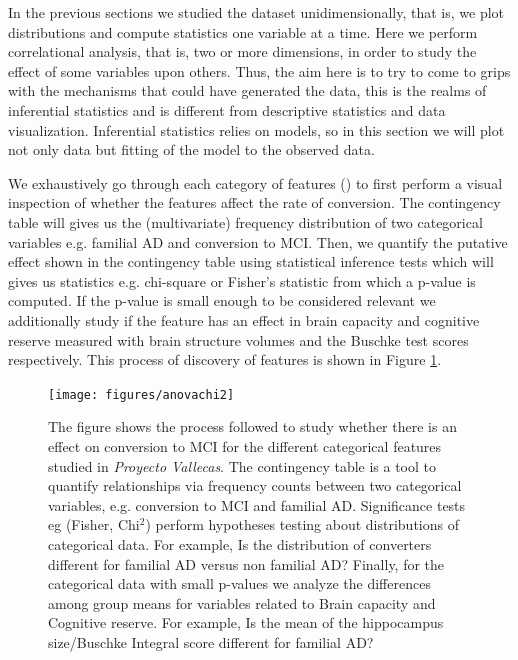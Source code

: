 \documentclass[11pt]{article}
\theoremstyle{definition}
\theoremstyle{remark}
\begin{document}
In the previous sections we studied the dataset unidimensionally, that is, we plot distributions and compute statistics one variable at a time. Here we perform correlational analysis, that is, two or more dimensions, in order to study the effect of some variables upon others. Thus, the aim here is to try to come to grips with the mechanisms that could have generated the data, this is the realms of inferential statistics and is different from descriptive statistics and data visualization. Inferential statistics relies on models, so in this section we will plot not only data but fitting of the model to the observed data.

We exhaustively go through each category of features () to first perform a visual inspection of whether the features affect the rate of conversion. The contingency table will gives us the (multivariate) frequency distribution of two categorical variables e.g. familial AD and conversion to MCI. Then, we quantify the putative effect shown in the contingency table  using statistical inference tests which will gives us statistics e.g. chi-square or Fisher's statistic from which a p-value is computed. If the p-value is small enough to be considered relevant we additionally study if the feature has an effect in brain capacity and cognitive reserve measured with brain structure volumes and the Buschke test scores respectively.
This process of discovery of features is shown in Figure \ref{fig:anovachi}.


\begin{figure}[H]
        \centering
        \texttt{[image: figures/anovachi2]}
        \caption{The figure shows the process followed to study whether there is an effect on conversion to MCI for the different categorical features studied in \emph{Proyecto Vallecas}. The contingency table is a tool to quantify relationships via frequency counts between two categorical variables, e.g. conversion to MCI and familial AD. Significance tests eg (Fisher, Chi$^2$) perform hypotheses testing about distributions of categorical data. For example, Is the distribution of converters different for familial AD versus non familial AD? Finally, for the categorical data with small p-values we analyze the differences among group means for variables related to Brain capacity and Cognitive reserve. For example, Is the mean of the hippocampus size/Buschke Integral score different for familial AD?
        } 
        \label{fig:anovachi}
\end{figure}
\end{document}
